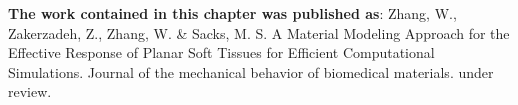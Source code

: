 \textbf{The work contained in this chapter was published as}: Zhang, W., Zakerzadeh, Z., Zhang, W. \& Sacks, M. S.
A Material Modeling Approach for the Effective Response of Planar Soft Tissues for Efficient Computational Simulations. 
Journal of the mechanical behavior of biomedical materials. under review.

















